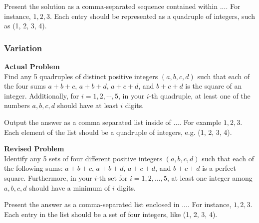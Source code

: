 Present the solution as a comma-separated sequence contained within $\boxed{...}$. For instance, $\boxed{1, 2, 3}$. Each entry should be represented as a quadruple of integers, such as (1, 2, 3, 4).

\subsubsection{Variation}
\textbf{Actual Problem}\\
Find any 5 quadruples of distinct positive integers $(a, b, c, d)$ such that each of the four sums $a+b+c$, $a+b+d$, $a+c+d$, and $b+c+d$ is the square of an integer.
Additionally, for $i = 1, 2, \cdots, 5$, in your $i$-th quadruple, at least one of the numbers $a, b, c, d$ should have at least $i$ digits.

Output the answer as a comma separated list inside of $\boxed{...}$. For example $\boxed{1, 2, 3}$.
Each element of the list should be a quadruple of integers, e.g. (1, 2, 3, 4).

\textbf{Revised Problem}\\
Identify any 5 sets of four different positive integers $(a, b, c, d)$ such that each of the following sums: $a+b+c$, $a+b+d$, $a+c+d$, and $b+c+d$ is a perfect square. Furthermore, in your $i$-th set for $i = 1, 2, \ldots, 5$, at least one integer among $a, b, c, d$ should have a minimum of $i$ digits.

Present the answer as a comma-separated list enclosed in $\boxed{...}$. For instance, $\boxed{1, 2, 3}$. Each entry in the list should be a set of four integers, like (1, 2, 3, 4).

